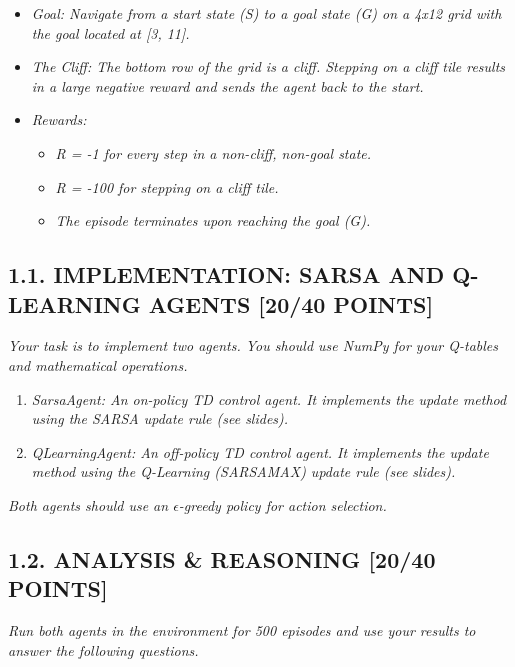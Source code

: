 \documentclass{article}
\begin{document}
\begin{itemize}
    \item \textit{Goal: Navigate from a start state (S) to a goal state (G) on a 4x12 grid with the goal located at [3, 11].}
    \item \textit{The Cliff: The bottom row of the grid is a cliff. Stepping on a cliff tile results in a large negative reward and sends the agent back to the start.}
    \item \textit{Rewards:}
    \begin{itemize}
        \item \textit{R = -1 for every step in a non-cliff, non-goal state.}
        \item \textit{R = -100 for stepping on a cliff tile.}
        \item \textit{The episode terminates upon reaching the goal (G).}
    \end{itemize}
\end{itemize}

\subsection{1.1. IMPLEMENTATION: SARSA AND Q-LEARNING AGENTS [20/40 POINTS]}

\textit{Your task is to implement two agents. You should use NumPy for your Q-tables and mathematical operations.}

\begin{enumerate}[label=\Alph*.]
    \item \textit{SarsaAgent: An on-policy TD control agent. It implements the update method using the SARSA update rule (see slides).}
    \item \textit{QLearningAgent: An off-policy TD control agent. It implements the update method using the Q-Learning (SARSAMAX) update rule (see slides).}
\end{enumerate}

\textit{Both agents should use an $\epsilon$-greedy policy for action selection.}


\subsection{1.2. ANALYSIS \& REASONING [20/40 POINTS]}

\textit{Run both agents in the environment for 500 episodes and use your results to answer the following questions.}
\end{document}
